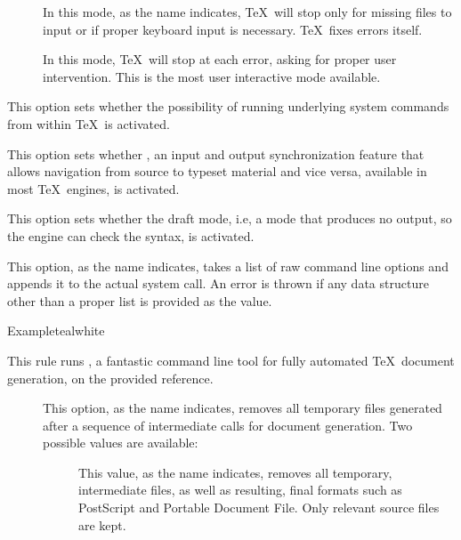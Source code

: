 \begin{description}
\begin{description}
\begin{description}
\item[] In this mode, as the name indicates, \TeX\ will stop only for missing files to input or if proper keyboard input is necessary. \TeX\ fixes errors itself.

\item[] In this mode, \TeX\ will stop at each error, asking for proper user intervention. This is the most user interactive mode available.
\end{description}

\item[\rpsbox{shell}] This option sets whether the possibility of running underlying system commands from within \TeX\ is activated.

\item[\rpsbox{synctex}] This option sets whether , an input and output synchronization feature that allows navigation from source to typeset material and vice versa, available in most \TeX\ engines, is activated.

\item[\rpsbox{draft}] This option sets whether the draft mode, i.e, a mode that produces no output, so the engine can check the syntax, is activated.

\item[\abox{options}] This option, as the name indicates, takes a list of raw command line options and appends it to the actual system call. An error is thrown if any data structure other than a proper list is provided as the value.
\end{description}

\begin{codebox}{Example}{teal}{\icnote}{white}
\end{codebox}

\item[\rulebox{latexmk}]
This rule runs , a fantastic command line tool for fully automated \TeX\ document generation, on the provided  reference.

\begin{description}
\item[] This option, as the name indicates, removes all temporary files generated after a sequence of intermediate calls for document generation. Two possible values are available:

\begin{description}
\item[] This value, as the name indicates, removes all temporary, intermediate files, as well as resulting, final formats such as PostScript and Portable Document File. Only relevant source files are kept.


\end{description}
\end{description}
\end{description}

